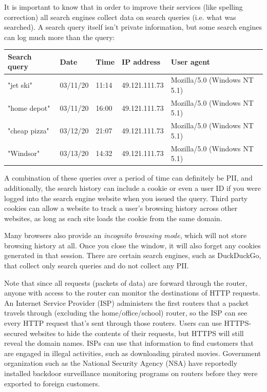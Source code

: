 \documentclass{article}
\begin{document}
  It is important to know that in order to improve their services (like spelling correction) all search engines collect data on search queries (i.e. what was searched). A search query itself isn't private information, but some search engines can log much more than the query: 
  \begin{center}
  \begin{tabular}{l|l|l|l|l}
      Search query & Date & Time & IP address & User agent \\
      \hline 
      "jet ski" & 03/11/20 & 11:14 & 49.121.111.73 & Mozilla/5.0 (Windows NT 5.1) \\
      "home depot" & 03/11/20 & 16:00 & 49.121.111.73 & Mozilla/5.0 (Windows NT 5.1) \\
      "cheap pizza" & 03/12/20 & 21:07 & 49.121.111.73 & Mozilla/5.0 (Windows NT 5.1) \\
      "Windsor" & 03/13/20 & 14:32 & 49.121.111.73 & Mozilla/5.0 (Windows NT 5.1) 
  \end{tabular}
  \end{center}
  A combination of these queries over a period of time can definitely be PII, and additionally, the search history can include a cookie or even a user ID if you were logged into the search engine website when you issued the query. Third party cookies can allow a website to track a user's browsing history across other websites, as long as each site loads the cookie from the same domain. 

  Many browsers also provide an \textit{incognito browsing mode}, which will not store browsing history at all. Once you close the window, it will also forget any cookies generated in that session. There are certain search engines, such as DuckDuckGo, that collect only search queries and do not collect any PII.

  Note that since all requests (packets of data) are forward through the router, anyone with access to the router can monitor the destinations of HTTP requests. An Internet Service Provider (ISP) administers the first routers that a packet travels through (excluding the home/office/school) router, so the ISP can see every HTTP request that's sent through those routers. Users can use HTTPS-secured websites to hide the contents of their requests, but HTTPS will still reveal the domain names. ISPs can use that information to find customers that are engaged in illegal activities, such as downloading pirated movies. Government organization such as the National Security Agency (NSA) have reportedly installed backdoor surveillance monitoring programs on routers before they were exported to foreign customers. 
\end{document}
